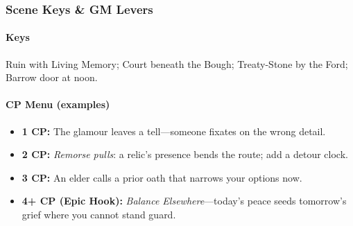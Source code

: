 \subsubsection{Scene Keys \& GM Levers}
\paragraph{Keys}
Ruin with Living Memory; Court beneath the Bough; Treaty-Stone by the Ford; Barrow door at noon.
\paragraph{CP Menu (examples)}
\begin{itemize}
  \item \textbf{1 CP:} The glamour leaves a tell—someone fixates on the wrong detail.
  \item \textbf{2 CP:} \emph{Remorse pulls}: a relic’s presence bends the route; add a detour clock.
  \item \textbf{3 CP:} An elder calls a prior oath that narrows your options now.
  \item \textbf{4+ CP (Epic Hook):} \emph{Balance Elsewhere}—today’s peace seeds tomorrow’s grief where you cannot stand guard.
\end{itemize}
